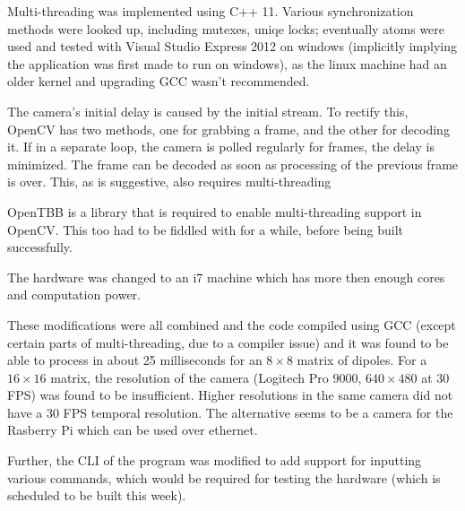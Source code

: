 			\par
			Multi-threading was implemented using C++ 11. Various synchronization methods were looked up, including mutexes, uniqe locks; eventually atoms were used and tested with Visual Studio Express 2012 on windows (implicitly implying the application was first made to run on windows), as the linux machine had an older kernel and upgrading GCC wasn't recommended.
			\par
			The camera's initial delay is caused by the initial stream. To rectify this, OpenCV has two methods, one for grabbing a frame, and the other for decoding it. If in a separate loop, the camera is polled regularly for frames, the delay is minimized. The frame can be decoded as soon as processing of the previous frame is over. This, as is suggestive, also requires multi-threading
			\par
			OpenTBB is a library that is required to enable multi-threading support in OpenCV. This too had to be fiddled with for a while, before being built successfully.
			\par
			The hardware was changed to an i7 machine which has more then enough cores and computation power.
			\par
			These modifications were all combined and the code compiled using GCC (except certain parts of multi-threading, due to a compiler issue) and it was found to be able to process in about 25 milliseconds for an $8 \times 8$ matrix of dipoles. For a $16 \times 16$ matrix, the resolution of the camera (Logitech Pro 9000, $640 \times 480$ at 30 FPS) was found to be insufficient. Higher resolutions in the same camera did not have a 30 FPS temporal resolution. The alternative seems to be a camera for the Rasberry Pi which can be used over ethernet.
			\par
			Further, the CLI of the program was modified to add support for inputting various commands, which would be required for testing the hardware (which is scheduled to be built this week).
